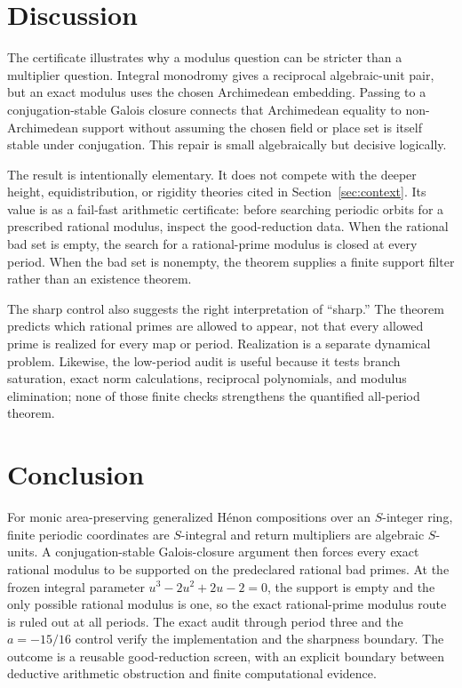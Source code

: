 \documentclass[11pt]{article}
\theoremstyle{definition}
\theoremstyle{remark}
\begin{document}
\section{Discussion}
\label{sec:discussion}

The certificate illustrates why a modulus question can be stricter than a
multiplier question.  Integral monodromy gives a reciprocal algebraic-unit
pair, but an exact modulus uses the chosen Archimedean embedding.  Passing to
a conjugation-stable Galois closure connects that Archimedean equality to
non-Archimedean support without assuming the chosen field or place set is
itself stable under conjugation.  This repair is small algebraically but
decisive logically.

The result is intentionally elementary.  It does not compete with the deeper
height, equidistribution, or rigidity theories cited in
Section~\ref{sec:context}.  Its value is as a fail-fast arithmetic certificate:
before searching periodic orbits for a prescribed rational modulus, inspect
the good-reduction data.  When the rational bad set is empty, the search for a
rational-prime modulus is closed at every period.  When the bad set is
nonempty, the theorem supplies a finite support filter rather than an
existence theorem.

The sharp control also suggests the right interpretation of ``sharp.''  The
theorem predicts which rational primes are allowed to appear, not that every
allowed prime is realized for every map or period.  Realization is a separate
dynamical problem.  Likewise, the low-period audit is useful because it tests
branch saturation, exact norm calculations, reciprocal polynomials, and
modulus elimination; none of those finite checks strengthens the quantified
all-period theorem.

\section{Conclusion}
\label{sec:conclusion}

For monic area-preserving generalized H\'enon compositions over an
$S$-integer ring, finite periodic coordinates are $S$-integral and return
multipliers are algebraic $S$-units.  A conjugation-stable Galois-closure
argument then forces every exact rational modulus to be supported on the
predeclared rational bad primes.  At the frozen integral parameter
$u^3-2u^2+2u-2=0$, the support is empty and the only possible rational modulus
is one, so the exact rational-prime modulus route is ruled out at all periods.
The exact audit through period three and the $a=-15/16$ control verify the
implementation and the sharpness boundary.  The outcome is a reusable
good-reduction screen, with an explicit boundary between deductive arithmetic
obstruction and finite computational evidence.
\end{document}
